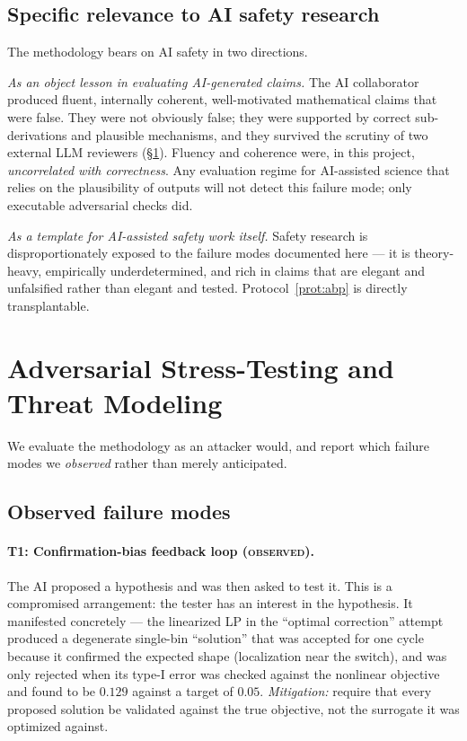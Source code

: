 \documentclass[11pt]{article}
\theoremstyle{remark}
\begin{document}
\subsection{Specific relevance to AI safety research}
The methodology bears on AI safety in two directions.

\emph{As an object lesson in evaluating AI-generated claims.} The AI collaborator produced fluent, internally coherent, well-motivated mathematical claims that were false. They were not obviously false; they were supported by correct sub-derivations and plausible mechanisms, and they survived the scrutiny of two external LLM reviewers (\S\ref{sec:redteam}). Fluency and coherence were, in this project, \emph{uncorrelated with correctness}. Any evaluation regime for AI-assisted science that relies on the plausibility of outputs will not detect this failure mode; only executable adversarial checks did.

\emph{As a template for AI-assisted safety work itself.} Safety research is disproportionately exposed to the failure modes documented here --- it is theory-heavy, empirically underdetermined, and rich in claims that are elegant and unfalsified rather than elegant and tested. Protocol~\ref{prot:abp} is directly transplantable.

\section{Adversarial Stress-Testing and Threat Modeling}
\label{sec:redteam}

We evaluate the methodology as an attacker would, and report which failure modes we \emph{observed} rather than merely anticipated.

\subsection{Observed failure modes}

\paragraph{T1: Confirmation-bias feedback loop (\textsc{observed}).}
The AI proposed a hypothesis and was then asked to test it. This is a compromised arrangement: the tester has an interest in the hypothesis. It manifested concretely --- the linearized LP in the ``optimal correction'' attempt produced a degenerate single-bin ``solution'' that was accepted for one cycle because it confirmed the expected shape (localization near the switch), and was only rejected when its type-I error was checked against the nonlinear objective and found to be $0.129$ against a target of $0.05$. \emph{Mitigation:} require that every proposed solution be validated against the true objective, not the surrogate it was optimized against.
\end{document}

